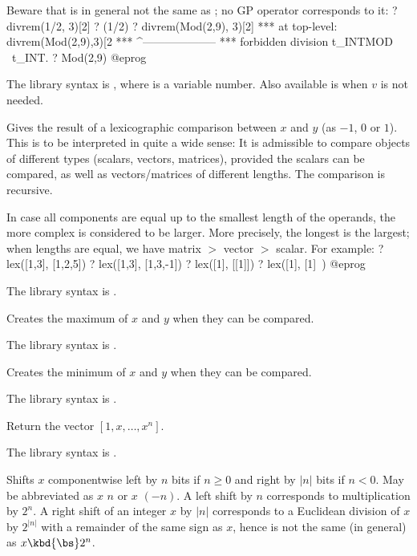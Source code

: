 Beware that  is in general not the same as
; no GP operator corresponds to it:
\bprog
? divrem(1/2, 3)[2]
? (1/2) %
? divrem(Mod(2,9), 3)[2]
 ***   at top-level: divrem(Mod(2,9),3)[2
 ***                 ^--------------------
 ***   forbidden division t_INTMOD \ t_INT.
? Mod(2,9) %
@eprog

The library syntax is , where  is a variable number.
Also available is  when $v$ is
not needed.

\label{se:lex}
Gives the result of a lexicographic comparison
between $x$ and $y$ (as $-1$, $0$ or $1$). This is to be interpreted in quite
a wide sense: It is admissible to compare objects of different types
(scalars, vectors, matrices), provided the scalars can be compared, as well
as vectors/matrices of different lengths. The comparison is recursive.

In case all components are equal up to the smallest length of the operands,
the more complex is considered to be larger. More precisely, the longest is
the largest; when lengths are equal, we have matrix $>$ vector $>$ scalar.
For example:
\bprog
? lex([1,3], [1,2,5])
? lex([1,3], [1,3,-1])
? lex([1], [[1]])
? lex([1], [1]~)
@eprog

The library syntax is .

\label{se:max}
Creates the maximum of $x$ and $y$ when they can be compared.

The library syntax is .

\label{se:min}
Creates the minimum of $x$ and $y$ when they can be compared.

The library syntax is .

\label{se:powers}
Return the vector $[1,x,\dots,x^n]$.

The library syntax is .

\label{se:shift}
Shifts $x$ componentwise left by $n$ bits if $n\ge0$ and right by $|n|$
bits if $n<0$. May be abbreviated as $x$ \kbd{<<} $n$ or $x$ \kbd{>>} $(-n)$.
A left shift by $n$ corresponds to multiplication by $2^n$. A right shift of an
integer $x$ by $|n|$ corresponds to a Euclidean division of $x$ by $2^{|n|}$
with a remainder of the same sign as $x$, hence is not the same (in general) as
$x \kbd{\bs} 2^n$.

